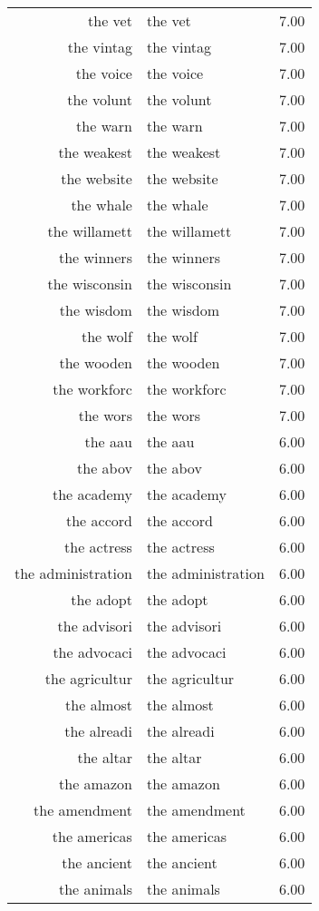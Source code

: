 \begin{table}[ht]
\begin{tabular}{rlr}
  the vet & the vet & 7.00 \\ 
  the vintag & the vintag & 7.00 \\ 
  the voice & the voice & 7.00 \\ 
  the volunt & the volunt & 7.00 \\ 
  the warn & the warn & 7.00 \\ 
  the weakest & the weakest & 7.00 \\ 
  the website & the website & 7.00 \\ 
  the whale & the whale & 7.00 \\ 
  the willamett & the willamett & 7.00 \\ 
  the winners & the winners & 7.00 \\ 
  the wisconsin & the wisconsin & 7.00 \\ 
  the wisdom & the wisdom & 7.00 \\ 
  the wolf & the wolf & 7.00 \\ 
  the wooden & the wooden & 7.00 \\ 
  the workforc & the workforc & 7.00 \\ 
  the wors & the wors & 7.00 \\ 
  the aau & the aau & 6.00 \\ 
  the abov & the abov & 6.00 \\ 
  the academy & the academy & 6.00 \\ 
  the accord & the accord & 6.00 \\ 
  the actress & the actress & 6.00 \\ 
  the administration & the administration & 6.00 \\ 
  the adopt & the adopt & 6.00 \\ 
  the advisori & the advisori & 6.00 \\ 
  the advocaci & the advocaci & 6.00 \\ 
  the agricultur & the agricultur & 6.00 \\ 
  the almost & the almost & 6.00 \\ 
  the alreadi & the alreadi & 6.00 \\ 
  the altar & the altar & 6.00 \\ 
  the amazon & the amazon & 6.00 \\ 
  the amendment & the amendment & 6.00 \\ 
  the americas & the americas & 6.00 \\ 
  the ancient & the ancient & 6.00 \\ 
  the animals & the animals & 6.00 \\ 

\end{tabular}
\end{table}
